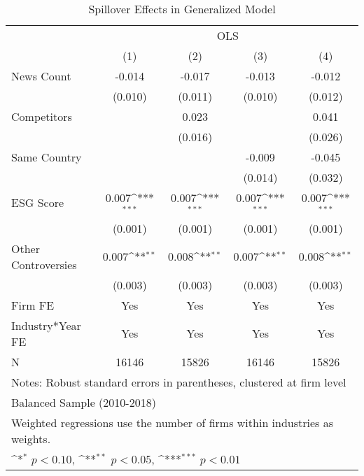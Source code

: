 \begin{table}[htbp]\centering
\def\sym#1{\ifmmode^{#1}\else\(^{#1}\)\fi}
\caption{Spillover Effects in Generalized Model}
\begin{tabular}{l*{4}{c}}
\toprule
                    &\multicolumn{4}{c}{OLS}                                                                \\\cmidrule(lr){2-5}
                    &\multicolumn{1}{c}{(1)}         &\multicolumn{1}{c}{(2)}         &\multicolumn{1}{c}{(3)}         &\multicolumn{1}{c}{(4)}         \\
\midrule
News Count          &      -0.014         &      -0.017         &      -0.013         &      -0.012         \\
                    &     (0.010)         &     (0.011)         &     (0.010)         &     (0.012)         \\
\addlinespace
Competitors         &                     &       0.023         &                     &       0.041         \\
                    &                     &     (0.016)         &                     &     (0.026)         \\
\addlinespace
Same Country        &                     &                     &      -0.009         &      -0.045         \\
                    &                     &                     &     (0.014)         &     (0.032)         \\
\addlinespace
ESG Score           &       0.007\sym{***}&       0.007\sym{***}&       0.007\sym{***}&       0.007\sym{***}\\
                    &     (0.001)         &     (0.001)         &     (0.001)         &     (0.001)         \\
\addlinespace
Other Controversies &       0.007\sym{**} &       0.008\sym{**} &       0.007\sym{**} &       0.008\sym{**} \\
                    &     (0.003)         &     (0.003)         &     (0.003)         &     (0.003)         \\
\midrule
Firm FE             &         Yes         &         Yes         &         Yes         &         Yes         \\
Industry*Year FE    &         Yes         &         Yes         &         Yes         &         Yes         \\
N                   &       16146         &       15826         &       16146         &       15826         \\
\bottomrule
\multicolumn{5}{l}{\footnotesize Notes: Robust standard errors in parentheses, clustered at firm level}\\
\multicolumn{5}{l}{\footnotesize Balanced Sample (2010-2018)}\\
\multicolumn{5}{l}{\footnotesize Weighted regressions use the number of firms within industries as weights.}\\
\multicolumn{5}{l}{\footnotesize \sym{*} \(p<0.10\), \sym{**} \(p<0.05\), \sym{***} \(p<0.01\)}\\
\end{tabular}
\end{table}
